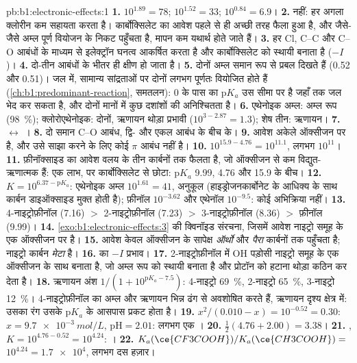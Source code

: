 \begin{solution}{pb:b1:electronic-effects:1}
\textbf{1.} $10^{1.89} = 78$; $10^{1.52} = 33$; $10^{0.84} = 6.9$।
\textbf{2.} नहीं: हर अगला क्लोरीन कम सहायता करता है। कार्बोक्सिलेट का
आवेश पहले से ही अच्छी तरह फैला हुआ है, और जैसे-जैसे अम्ल पूर्ण वियोजन के निकट पहुँचता है,
मापन कम यथार्थ होते जाते हैं।
\textbf{3.} हर Cl, C--C और C--O आबंधों के माध्यम से इलेक्ट्रॉन घनत्व आकर्षित करता है
और कार्बोक्सिलेट को स्थायी बनाता है ($-I$)।
\textbf{4.}  दो-तीन आबंधों के भीतर ही क्षीण हो जाता है।
\textbf{5.} दोनों अम्ल समान रूप से प्रबल दिखते हैं (0.52 और 0.51)। जल में,
सामान्य सांद्रताओं पर दोनों लगभग पूर्णतः वियोजित होते हैं
(\cref{ch:b1:predominant-reaction}, समतलन): 0 के पास का $\mathrm{p}K_a$
उस सीमा पर है जहाँ तक जल भेद कर सकता है, और दोनों मानों में
कुछ दशांशों की अनिश्चितता है।
\textbf{6.} एथेनोइक अम्ल: अम्ल रूप (\qty{98}{\percent}); क्लोरोएथेनोइक:
दोनों, ऋणायन थोड़ा प्रभावी ($10^{3 - 2.87} = 1.3$); शेष तीन:
ऋणायन।
\textbf{7.}  $\leftrightarrow$ ।
\textbf{8.} दो समान C--O आबंध, द्वि- और एकल आबंध के बीच के।
\textbf{9.} आवेश अकेले ऑक्सीजन पर है, और उसे साझा करने के लिए कोई $\pi$ आबंध
नहीं है।
\textbf{10.} $10^{15.9 - 4.76} = 10^{11.1}$, लगभग $10^{11}$।
\textbf{11.} फ़ीनॉक्साइड का आवेश वलय के तीन कार्बनों तक फैलता है, जो ऑक्सीजन से कम
विद्युत-ऋणात्मक हैं: एक लाभ, पर कार्बोक्सिलेट से छोटा:
$\mathrm{p}K_a$ 9.99, 4.76 और 15.9 के बीच।
\textbf{12.} $K = 10^{6.37 - \mathrm{p}K_a}$: एथेनोइक अम्ल $10^{1.61} = 41$,
अनुकूल (हाइड्रोजनकार्बोनेट के आधिक्य के साथ कार्बन डाइऑक्साइड मुक्त होती है);
फ़ीनॉल $10^{-3.62}$ और एथेनॉल $10^{-9.5}$: कोई अभिक्रिया नहीं।
\textbf{13.} 4-नाइट्रोफ़ीनॉल (7.16) $>$ 2-नाइट्रोफ़ीनॉल (7.23) $>$ 3-नाइट्रोफ़ीनॉल
(8.36) $>$ फ़ीनॉल (9.99)।
\textbf{14.} \cref{exo:b1:electronic-effects:3} की क्विनॉइड संरचना,
जिसमें आवेश नाइट्रो समूह के एक ऑक्सीजन पर है।
\textbf{15.} आवेश केवल ऑक्सीजन के सापेक्ष \textit{ऑर्थो} और
\textit{पैरा} कार्बनों तक पहुँचता है; नाइट्रो कार्बन \textit{मेटा} है।
\textbf{16.}  का $-I$ प्रभाव।
\textbf{17.} 2-नाइट्रोफ़ीनॉल में OH पड़ोसी नाइट्रो समूह के एक ऑक्सीजन के साथ
 बनाता है, जो अम्ल रूप को स्थायी बनाता है और
प्रोटॉन को हटाना थोड़ा कठिन कर देता है।
\textbf{18.} ऋणायन अंश $1/(1 + 10^{\mathrm{p}K_a - 7.5})$: 4-नाइट्रो
\qty{69}{\percent}, 2-नाइट्रो \qty{65}{\percent}, 3-नाइट्रो
\qty{12}{\percent}। 4-नाइट्रोफ़ीनॉल का अम्ल और ऋणायन भिन्न ढंग से अवशोषित करते हैं,
ऋणायन दृश्य क्षेत्र में: उसका रंग उसके $\mathrm{p}K_a$ के आसपास प्रकट होता है।
\textbf{19.} $x^2/(0.010 - x) = 10^{-0.52} = 0.30$: $x = \qty{9.7e-3}{mol/L}$,
$\mathrm{pH} = 2.01$: लगभग एक ।
\textbf{20.} $\frac12(4.76 + 2.00) = 3.38$।
\textbf{21.} , $K = 10^{4.76 -
0.52} = 10^{4.24}$: ।
\textbf{22.} $K_a(\ce{CF3COOH})/K_a(\ce{CH3COOH}) =$ \textbf{$10^{4.24} =
\num{1.7e4}$}, लगभग दस हज़ार।
\end{solution}

